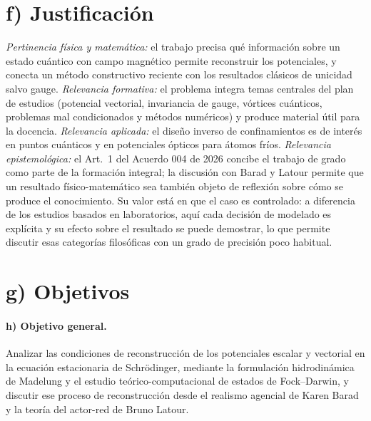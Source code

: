 \documentclass[12pt,letterpaper]{article}
\begin{document}
\section*{f) Justificación}
\emph{Pertinencia física y matemática:} el trabajo precisa qué información sobre un estado cuántico con campo magnético
permite reconstruir los potenciales, y conecta un método constructivo reciente con los resultados clásicos de unicidad
salvo gauge. \emph{Relevancia formativa:} el problema integra temas centrales del plan de estudios (potencial vectorial,
invariancia de gauge, vórtices cuánticos, problemas mal condicionados y métodos numéricos) y produce material útil para
la docencia. \emph{Relevancia aplicada:} el diseño inverso de confinamientos es de interés en puntos cuánticos y en
potenciales ópticos para átomos fríos. \emph{Relevancia epistemológica:} el Art.~1 del Acuerdo 004 de 2026 concibe el
trabajo de grado como parte de la formación integral; la discusión con Barad y Latour permite que un resultado
físico-matemático sea también objeto de reflexión sobre cómo se produce el conocimiento. Su valor está en que el caso es
controlado: a diferencia de los estudios basados en laboratorios, aquí cada decisión de modelado es explícita y su efecto
sobre el resultado se puede demostrar, lo que permite discutir esas categorías filosóficas con un grado de precisión
poco habitual.

\section*{g) Objetivos}
\paragraph{h) Objetivo general.} Analizar las condiciones de reconstrucción de los potenciales escalar y vectorial en la
ecuación estacionaria de Schrödinger, mediante la formulación hidrodinámica de Madelung y el estudio teórico-computacional
de estados de Fock--Darwin, y discutir ese proceso de reconstrucción desde el realismo agencial de Karen Barad y la teoría
del actor-red de Bruno Latour.
\end{document}
